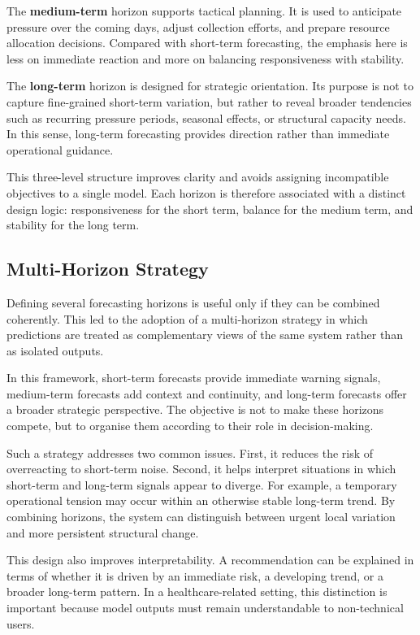 The \textbf{medium-term} horizon supports tactical planning. It is used to anticipate pressure over the coming days, adjust collection efforts, and prepare resource allocation decisions. Compared with short-term forecasting, the emphasis here is less on immediate reaction and more on balancing responsiveness with stability.

The \textbf{long-term} horizon is designed for strategic orientation. Its purpose is not to capture fine-grained short-term variation, but rather to reveal broader tendencies such as recurring pressure periods, seasonal effects, or structural capacity needs. In this sense, long-term forecasting provides direction rather than immediate operational guidance.

This three-level structure improves clarity and avoids assigning incompatible objectives to a single model. Each horizon is therefore associated with a distinct design logic: responsiveness for the short term, balance for the medium term, and stability for the long term.

\subsection{Multi-Horizon Strategy}
\label{sec:multi-horizon-strategy}

Defining several forecasting horizons is useful only if they can be combined coherently. This led to the adoption of a multi-horizon strategy in which predictions are treated as complementary views of the same system rather than as isolated outputs.

In this framework, short-term forecasts provide immediate warning signals, medium-term forecasts add context and continuity, and long-term forecasts offer a broader strategic perspective. The objective is not to make these horizons compete, but to organise them according to their role in decision-making.

Such a strategy addresses two common issues. First, it reduces the risk of overreacting to short-term noise. Second, it helps interpret situations in which short-term and long-term signals appear to diverge. For example, a temporary operational tension may occur within an otherwise stable long-term trend. By combining horizons, the system can distinguish between urgent local variation and more persistent structural change.

This design also improves interpretability. A recommendation can be explained in terms of whether it is driven by an immediate risk, a developing trend, or a broader long-term pattern. In a healthcare-related setting, this distinction is important because model outputs must remain understandable to non-technical users.

